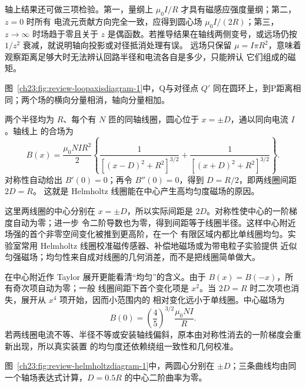 轴上结果还可做三项检验。第一，量纲上 $\mu_0I/R$ 才具有磁感应强度量纲；第二，$z=0$ 时所有
电流元贡献方向完全一致，应得到圆心场 $\mu_0I/(2R)$；第三，$z\to\infty$ 时场趋于零且关于 $z$
是偶函数。若推导结果在轴线两侧变号，或远场仍按 $1/z^2$ 衰减，就说明轴向投影或对径抵消处理有误。
远场只保留 $\mu=I\pi R^2$，意味着观察距离足够大时无法辨认回路半径和电流各自是多少，只能辨认
它们组成的磁矩。

图~\ref{ch23:fig:review-loopaxisdiagram-1}中，Q与对径点 $Q\prime$ 同在圆环上，到P距离相同；两个场的横向分量相消，轴向分量相加。
\par\noindent\begin{minipage}{\linewidth}
\loopAxisDiagram
{}\label{ch23:fig:review-loopaxisdiagram-1}
\end{minipage}\par\medskip

两个半径均为 $R$、每个有 $N$ 匝的同轴线圈，圆心位于 $x=\pm D$，通以同向电流 $I$。轴线上
的合场为
\begin{equation}
  B(x)=\frac{\mu_0NIR^2}{2}
  \left\{
  \frac{1}{[(x-D)^2+R^2]^{3/2}}
  +\frac{1}{[(x+D)^2+R^2]^{3/2}}
  \right\}.
\end{equation}
对称性自动给出 $B'(0)=0$；再令 $B''(0)=0$，得到 $D=R/2$，即两线圈间距 $2D=R$。
这就是 Helmholtz 线圈能在中心产生高均匀度磁场的原因。

这里两线圈的中心分别在 $x=\pm D$，所以实际间距是 $2D$。对称性使中心的一阶梯度自动为零；进一步
令二阶导数也为零，得到间距等于线圈半径。这样中心附近场强的首个非零空间变化被推到更高阶，在一个
有限区域内都比单线圈均匀。实验室常用 Helmholtz 线圈校准磁传感器、补偿地磁场或为带电粒子实验提供
近似匀强磁场；均匀性来自成对线圈的几何消差，而不是把线圈简单做大。

在中心附近作 Taylor 展开更能看清“均匀”的含义。由于 $B(x)=B(-x)$，所有奇次项自动为零；一般
线圈间距下首个变化项是 $x^2$。当 $2D=R$ 时二次项也消失，展开从 $x^4$ 项开始，因而小范围内的
相对变化远小于单线圈。中心磁场为
\begin{equation}
  B(0)=\left(\frac45\right)^{3/2}\frac{\mu_0NI}{R}.
\end{equation}
若两线圈电流不等、半径不等或安装轴线偏斜，原本由对称性消去的一阶梯度会重新出现，所以真实装置
的均匀度还依赖绕组一致性和几何校准。

图~\ref{ch23:fig:review-helmholtzdiagram-1}中，两圆心分别在 $\pm D$；三条曲线均由同一个轴场表达式计算，$D=0.5R$ 的中心二阶曲率为零。
\par\noindent\begin{minipage}{\linewidth}
\helmholtzDiagram
{}\label{ch23:fig:review-helmholtzdiagram-1}
\end{minipage}\par\medskip

